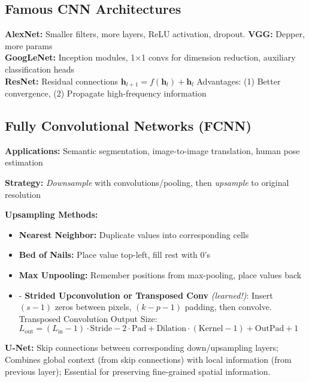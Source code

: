 \subsection{Famous CNN Architectures}

\textbf{AlexNet:} Smaller filters, more layers, ReLU activation, dropout. \textbf{VGG:} Depper, more params \\
\textbf{GoogLeNet:} Inception modules, 1×1 convs for dimension reduction, auxiliary classification heads\\
\textbf{ResNet:} Residual connections $\mathbf{h}_{l+1} = f(\mathbf{h}_l) + \mathbf{h}_l$
Advantages: (1) Better convergence, (2) Propagate high-frequency information

\subsection{Fully Convolutional Networks (FCNN)}

\textbf{Applications:} Semantic segmentation, image-to-image translation, human pose estimation

\textbf{Strategy:} \textit{Downsample} with convolutions/pooling, then \textit{upsample} to original resolution

\textbf{Upsampling Methods:}
\begin{itemize}
    \item \textbf{Nearest Neighbor:} Duplicate values into corresponding cells
    \item \textbf{Bed of Nails:} Place value top-left, fill rest with $0$'s
    \item \textbf{Max Unpooling:} Remember positions from max-pooling, place values back
    \item - \textbf{Strided Upconvolution or Transposed Conv} \textit{(learned!)}:  Insert $(s-1)$ zeros between pixels, $(k-p-1)$ padding, then convolve. Transposed Convolution Output Size: $L_{\text{out}} = (L_{\text{in}} - 1) \cdot \text{Stride} - 2 \cdot \text{Pad} + \text{Dilation} \cdot (\text{Kernel} - 1) + \text{OutPad} + 1$
\end{itemize}

\textbf{U-Net:} Skip connections between corresponding down/upsampling layers; Combines global context (from skip connections) with local information (from previous layer); Essential for preserving fine-grained spatial information.